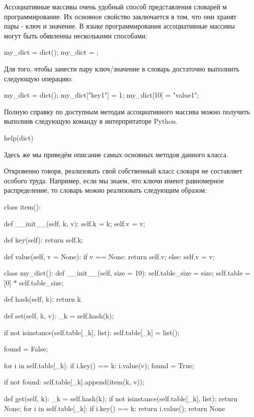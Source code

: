 Ассоциативные массивы очень удобный способ представления словарей
м программирование. Их основное свойство заключается в том, что 
они хранят пары - ключ и значение. В языке программирования 
ассоциативные массивы могут быть обявленны несколькими способами:

\begin{python}
my_dict = dict();
my_dict = {};
\end{python}

Для того, чтобы занести пару ключ/значение в словарь достаточно выполнить следующую
операцию:

\begin{python}
my_dict = dict();
my_dict["key1"] = 1;
my_dict[10] = "value1";
\end{python}

Полную справку по доступным методам ассоциативного массива можно получить 
выполнив следующую команду в интерпритаторе Python.

\begin{python}
help(dict)
\end{python}

Здесь же мы приведём описание самых основных методов данного класса. 

Откровенно говоря, реализовать свой собственный класс словаря не составляет
особого труда. Например, если мы знаем, что ключи имеют равномерное 
распределение, то словарь можно реализовать следующим образом:

\begin{python}
class item():

	def __init__(self, k, v):
		self.k = k;
		self.v = v;

	def key(self):
		return self.k;

	def value(self, v = None):
		if v == None:
			return self.v;
		else:
			self.v = v;

class my_dict():
	def __init__(self, size = 10):
		self.table_size = size;
		self.table = [0] * self.table_size;

	def hash(self, k):
		return k %

	def set(self, k, v):
		_k = self.hash(k);

		if not isinstance(self.table[_k], list):
			self.table[_k] = list();

		found = False;

		for i in self.table[_k]:
			if i.key() == k:
				i.value(v);	
				found = True;

		if not found:
			self.table[_k].append(item(k, v));


	def get(self, k):
		_k = self.hash(k);
		if not isinstance(self.table[_k], list):
			return None;
		for i in self.table[_k]:
			if i.key() == k:
				return i.value();
		return None
\end{python}

